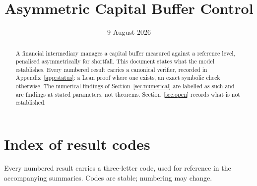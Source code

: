\documentclass[11pt]{article}
\title{Asymmetric Capital Buffer Control}
\author{}
\date{9 August 2026}
\theoremstyle{remark}
\begin{document}
\maketitle

\begin{abstract}
\noindent
A financial intermediary manages a capital buffer measured against a
reference level, penalised asymmetrically for shortfall. This document
states what the model establishes. Every numbered result carries a
canonical verifier, recorded in Appendix~\ref{app:status}: a Lean proof
where one exists, an exact symbolic check otherwise. The numerical
findings of Section~\ref{sec:numerical} are labelled as such and are
findings at stated parameters, not theorems. Section~\ref{sec:open}
records what is not established.
\end{abstract}

\tableofcontents

\section*{Index of result codes}
\noindent
Every numbered result carries a three-letter code, used for reference in
the accompanying summaries. Codes are stable; numbering may change.
\end{document}
